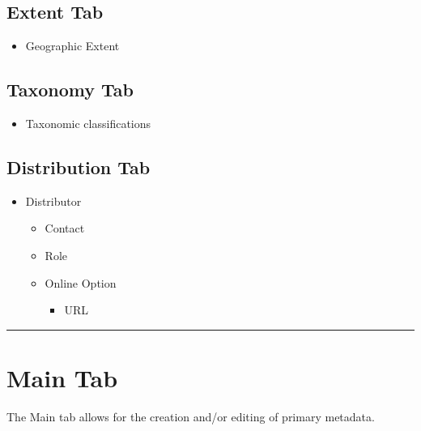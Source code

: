 \documentclass[
]{book}
\providecommand{\tightlist}{%
  \setlength{\itemsep}{0pt}\setlength{\parskip}{0pt}}
\begin{document}
\hypertarget{extent-tab-1}{%
\subsection{Extent Tab}\label{extent-tab-1}}

\begin{itemize}
\tightlist
\item
  Geographic Extent
\end{itemize}

\hypertarget{taxonomy-tab-1}{%
\subsection{Taxonomy Tab}\label{taxonomy-tab-1}}

\begin{itemize}
\tightlist
\item
  Taxonomic classifications
\end{itemize}

\hypertarget{distribution-tab}{%
\subsection{Distribution Tab}\label{distribution-tab}}

\begin{itemize}
\tightlist
\item
  Distributor

  \begin{itemize}
  \tightlist
  \item
    Contact
  \item
    Role
  \item
    Online Option

    \begin{itemize}
    \tightlist
    \item
      URL
    \end{itemize}
  \end{itemize}
\end{itemize}

\begin{center}\rule{0.5\linewidth}{\linethickness}\end{center}

\hypertarget{product-main}{%
\section{Main Tab}\label{product-main}}

The Main tab allows for the creation and/or editing of primary metadata.
\end{document}
